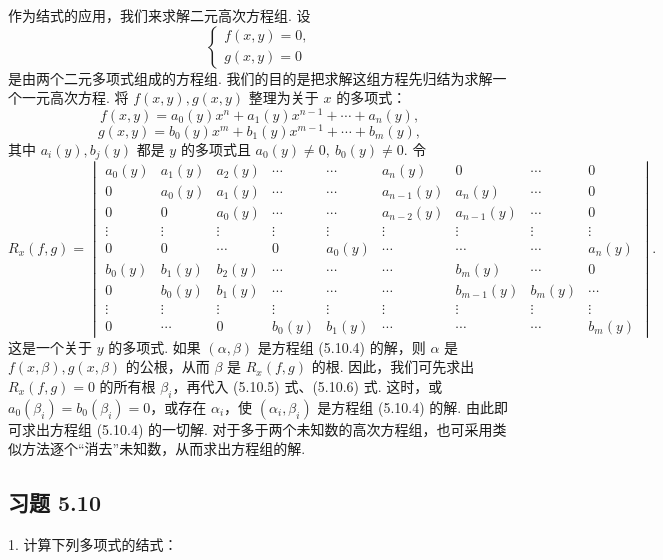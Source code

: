 \documentclass[UTF8,12pt,a4paper,fontset=fandol]{ctexart}
\begin{document}
作为结式的应用，我们来求解二元高次方程组. 设
\begin{equation}
\begin{cases}
f(x,y)=0,\\
g(x,y)=0
\end{cases}
\tag{5.10.4}
\end{equation}
是由两个二元多项式组成的方程组. 我们的目的是把求解这组方程先归结为求解一个一元高次方程. 将 $f(x,y),g(x,y)$ 整理为关于 $x$ 的多项式：
\begin{equation}
f(x,y)=a_0(y)x^n+a_1(y)x^{n-1}+\cdots+a_n(y),
\tag{5.10.5}
\end{equation}
\begin{equation}
g(x,y)=b_0(y)x^m+b_1(y)x^{m-1}+\cdots+b_m(y),
\tag{5.10.6}
\end{equation}
其中 $a_i(y),b_j(y)$ 都是 $y$ 的多项式且 $a_0(y)\neq 0,\ b_0(y)\neq 0$. 令
\[
R_x(f,g)=
\begin{vmatrix}
a_0(y)&a_1(y)&a_2(y)&\cdots&\cdots&a_n(y)&0&\cdots&0\\
0&a_0(y)&a_1(y)&\cdots&\cdots&a_{n-1}(y)&a_n(y)&\cdots&0\\
0&0&a_0(y)&\cdots&\cdots&a_{n-2}(y)&a_{n-1}(y)&\cdots&0\\
\vdots&\vdots&\vdots&\vdots&\vdots&\vdots&\vdots&\vdots&\vdots\\
0&0&\cdots&0&a_0(y)&\cdots&\cdots&\cdots&a_n(y)\\
b_0(y)&b_1(y)&b_2(y)&\cdots&\cdots&\cdots&b_m(y)&\cdots&0\\
0&b_0(y)&b_1(y)&\cdots&\cdots&\cdots&b_{m-1}(y)&b_m(y)&\cdots\\
\vdots&\vdots&\vdots&\vdots&\vdots&\vdots&\vdots&\vdots&\vdots\\
0&\cdots&0&b_0(y)&b_1(y)&\cdots&\cdots&\cdots&b_m(y)
\end{vmatrix}.
\]
这是一个关于 $y$ 的多项式. 如果 $(\alpha,\beta)$ 是方程组 (5.10.4) 的解，则 $\alpha$ 是 $f(x,\beta),g(x,\beta)$ 的公根，从而 $\beta$ 是 $R_x(f,g)$ 的根. 因此，我们可先求出 $R_x(f,g)=0$ 的所有根 $\beta_i$，再代入 (5.10.5) 式、(5.10.6) 式. 这时，或 $a_0(\beta_i)=b_0(\beta_i)=0$，或存在 $\alpha_i$，使 $(\alpha_i,\beta_i)$ 是方程组 (5.10.4) 的解. 由此即可求出方程组 (5.10.4) 的一切解. 对于多于两个未知数的高次方程组，也可采用类似方法逐个“消去”未知数，从而求出方程组的解.

\subsection*{习题 5.10}

1. 计算下列多项式的结式：
\end{document}
